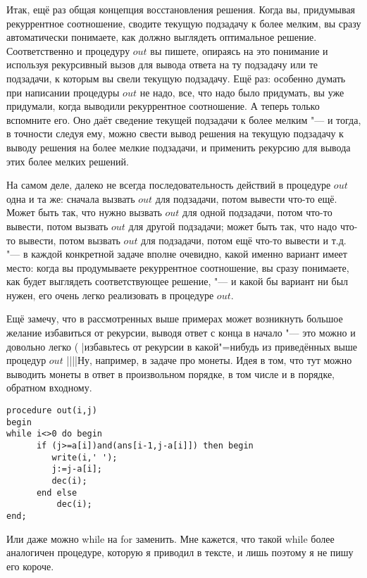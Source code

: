 Итак, ещё раз общая концепция восстановления решения. Когда вы, придумывая рекуррентное соотношение,
сводите текущую подзадачу к более мелким, вы сразу автоматически понимаете, как должно выглядеть
оптимальное решение. Соответственно и процедуру $out$ вы пишете, опираясь на это понимание и
используя рекурсивный вызов для вывода ответа на ту подзадачу или те подзадачи, к которым вы свели
текущую подзадачу. Ещё раз: особенно думать при написании процедуры $out$ не надо, все, что надо 
было придумать, вы уже придумали, когда выводили рекуррентное соотношение. А теперь только 
вспомните его. Оно даёт сведение текущей подзадачи к более мелким "--- и тогда, в точности следуя 
ему, можно свести вывод решения на текущую подзадачу к выводу решения на более мелкие подзадачи, и 
применить рекурсию для вывода этих более мелких решений.

На самом деле, далеко не всегда последовательность действий в процедуре $out$ одна и та же: сначала
вызвать $out$ для подзадачи, потом вывести что-то ещё. Может быть так, что нужно вызвать $out$ для
одной подзадачи, потом что-то вывести, потом вызвать $out$ для другой подзадачи; может быть так, что
надо что-то вывести, потом вызвать $out$ для подзадачи, потом ещё что-то вывести и т.д. "--- в
каждой конкретной задаче вполне очевидно, какой именно вариант имеет место: когда вы продумываете
рекуррентное соотношение, вы сразу понимаете, как будет выглядеть соответствующее решение, "--- и
какой бы вариант ни был нужен, его очень легко реализовать в процедуре $out$.

Ещё замечу, что в рассмотренных выше примерах может возникнуть большое желание избавиться от
рекурсии, выводя ответ с конца в начало "--- это можно и довольно легко (%
\task|избавьтесь от рекурсии в какой"=нибудь из приведённых выше процедур $out$%
||||Ну, например, в задаче про монеты. Идея в том, что тут можно выводить монеты в ответ в произвольном 
порядке, в том числе и в порядке, обратном входному.
\begin{codesampleo}\begin{verbatim}
procedure out(i,j)
begin
while i<>0 do begin
      if (j>=a[i])and(ans[i-1,j-a[i]]) then begin
         write(i,' ');
         j:=j-a[i];
         dec(i);
      end else 
          dec(i);
end;
\end{verbatim}\end{codesampleo}
Или даже можно while на for заменить. Мне кажется, что такой while более аналогичен процедуре, 
которую я приводил в тексте, и лишь поэтому я не пишу его короче.

